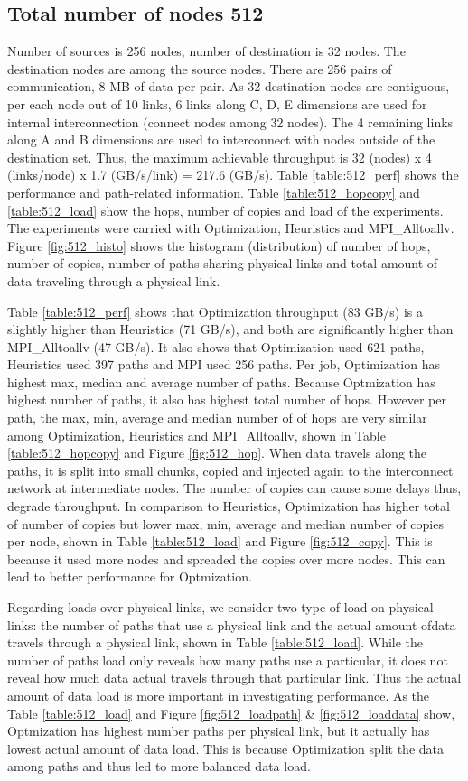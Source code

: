 \documentclass[letter]{article}
\begin{document}
\subsection {Total number of nodes 512}

Number of sources is 256 nodes, number of destination is 32 nodes. The destination nodes are among the source nodes. There are 256 pairs of communication, 8 MB of data per pair. As 32 destination nodes are contiguous, per each node out of 10 links, 6 links along C, D, E dimensions are used for internal interconnection (connect nodes among 32 nodes). The 4 remaining links along A and B dimensions are used to interconnect with nodes outside of the destination set. Thus, the maximum achievable throughput is 32 (nodes) x 4 (links/node) x 1.7 (GB/s/link) = 217.6 (GB/s). Table \ref{table:512_perf} shows the performance and path-related information. Table \ref{table:512_hopcopy} and \ref{table:512_load} show the hops, number of copies and load of the experiments. The experiments were carried with Optimization, Heuristics and MPI\_Alltoallv. Figure \ref{fig:512_histo} shows the histogram (distribution) of number of hops, number of copies, number of paths sharing physical links and total amount of data traveling through a physical link.

Table \ref{table:512_perf} shows that Optimization throughput (83 GB/s) is a slightly higher than Heuristics (71 GB/s), and both are significantly higher than MPI\_Alltoallv (47 GB/s). It also shows that Optimization used 621 paths, Heuristics used 397 paths and MPI used 256 paths. Per job, Optimization has highest max, median and average number of paths. Because Optmization has highest number of paths, it also has highest total number of hops. However per path, the max, min, average and median number of of hops are very similar among Optimization, Heuristics and MPI\_Alltoallv, shown in Table \ref{table:512_hopcopy} and Figure \ref{fig:512_hop}. When data travels along the paths, it is split into small chunks, copied and injected again to the interconnect network at intermediate nodes. The number of copies can cause some delays thus, degrade throughput. In comparison to Heuristics, Optimization has higher total of number of copies but lower max, min, average and median number of copies per node, shown in Table \ref{table:512_load} and Figure \ref{fig:512_copy}. This is because it used more nodes and spreaded the copies over more nodes. This can lead to better performance for Optmization.

Regarding loads over physical links, we consider two type of load on physical links: the number of paths that use a physical link and the actual amount ofdata travels through a physical link, shown in Table \ref{table:512_load}. While the number of paths load only reveals how many paths use a particular, it does not reveal how much data actual travels through that particular link. Thus the actual amount of data load is more important in investigating performance. As the Table \ref{table:512_load} and Figure \ref{fig:512_loadpath} \& \ref{fig:512_loaddata}  show, Optmization has highest number paths per physical link, but it actually has lowest actual amount of data load. This is because Optimization split the data among paths and thus led to more balanced data load.
\end{document}
